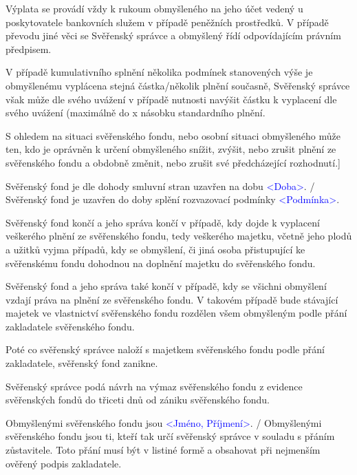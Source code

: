 \documentclass[parskip=half]{scrreprt}
\begin{document}
\begin{contract}
Výplata se provádí vždy k rukoum obmyšleného na jeho účet vedený u poskytovatele bankovních služem v případě peněžních prostředků. V případě převodu jiné věci se Svěřenský správce a obmyšlený řídí odpovídajícím právním předpisem.

V případě kumulativního splnění několika podmínek stanovených výše je obmyšlenému vyplácena stejná částka/několik plnění současně, Svěřenský správce však může dle svého uvážení v případě nutnosti navýšit částku k vyplacení dle svého uvážení (maximálně do x násobku standardního plnění.

S ohledem na situaci svěřenského fondu, nebo osobní situaci obmyšleného může ten, kdo je oprávněn k určení obmyšleného snížit, zvýšit, nebo zrušit plnění ze svěřenského fondu a obdobně změnit, nebo zrušit své předcházející rozhodnutí.]
\parnumbertrue


Svěřenský fond je dle dohody smluvní stran uzavřen na dobu \textcolor{blue}{<Doba>}. / Svěřenský fond je uzavřen do doby splění rozvazovací podmínky \textcolor{blue}{<Podmínka>}.

Svěřenský fond končí a jeho správa končí v případě, kdy dojde k vyplacení veškerého plnění ze svěřenského fondu, tedy veškerého majetku, včetně jeho plodů a užitků vyjma případů, kdy se obmyšlení, či jiná osoba přistupující ke svěřenskému fondu dohodnou na doplnění majetku do svěřenského fondu.

Svěřenský fond a jeho správa také končí v případě, kdy se všichni obmyšlení vzdají práva na plnění ze svěřenského fondu. V takovém případě bude stávající majetek ve vlastnictví svěřenského fondu rozdělen všem obmyšleným podle přání zakladatele svěřenského fondu.

Poté co svěřenský správce naloží s majetkem svěřenského fondu podle přání zakladatele, svěřenský fond zanikne.

Svěřenský správce podá návrh na výmaz svěřenského fondu z evidence svěřenských fondů do třiceti dnů od zániku svěřenského fondu.



Obmyšlenými svěřenského fondu jsou \textcolor{blue}{<Jméno, Příjmení>}. / Obmyšlenými svěřenského fondu jsou ti, kteří tak určí svěřenský správce v souladu s přáním zůstavitele. Toto přání musí být v listiné formě a obsahovat při nejmenším ověřený podpis zakladatele.


\end{contract}
\end{document}
